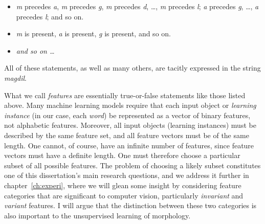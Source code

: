 \begin{definition}
\begin{itemize}
   \item \textit{m} precedes \textit{a}, \textit{m} precedes \textit{g}, \textit{m} precedes \textit{d}, \dots, \textit{m} precedes \textit{l}; \textit{a} precedes \textit{g}, \dots , \textit{a} precedes \textit{l}; and so on.
   \item \textit{m} is present, \textit{a} is present, \textit{g} is present, and so on.
   \item \emph{and so on \dots}
\end{itemize}
All of these statements, as well as many others,
are tacitly expressed in the string \textit{magdil}.

What we call \emph{features} are essentially true-or-false statements like those listed above.
Many machine learning models require that each input object or \emph{learning instance} 
(in our case, each \emph{word}) be represented as a vector of binary features, not alphabetic 
features. Moreover, all input objects (learning instances) must be described by the same feature 
set, and all feature vectors must be of the same length.
One cannot, of course, have an infinite number of features, since feature vectors must have a definite length.
One must therefore choose a particular subset of all possible features. The problem of choosing a likely subset constitutes one of
this dissertation's main research questions, and we
address it further in chapter~\ref{ch:experi}, where we will glean some insight 
by considering feature categories that 
are significant to computer vision, particularly \emph{invariant} and \emph{variant} features. I will argue that the distinction between these two categories is also important to the unsupervised learning of morphology.



\end{definition}
